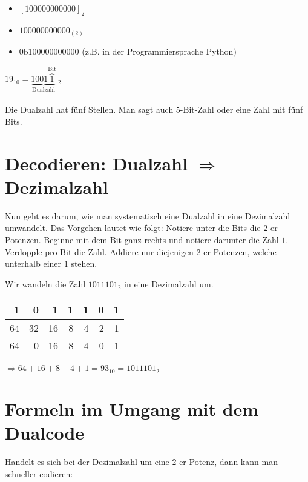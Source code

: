 \begin{itemize}
	\item $[100000000000]_2$
	\item $100000000000_{(2)}$
	\item $0\text{b}100000000000$ (z.B. in der Programmiersprache Python)
\end{itemize}

\begin{example}
$19_{10} = \underbrace{1001\overbrace{1}^{\textrm{Bit}}}_{\textrm{Dualzahl}}$$~_2$ \\ \\ Die Dualzahl hat fünf Stellen. Man sagt auch $5$-Bit-Zahl oder eine Zahl mit fünf Bits.
\end{example}

\section{Decodieren: Dualzahl $\Rightarrow$ Dezimalzahl}

Nun geht es darum, wie man systematisch eine Dualzahl in eine Dezimalzahl umwandelt. Das Vorgehen lautet wie folgt: Notiere unter die Bits die $2$-er Potenzen. Beginne mit dem Bit ganz rechts und notiere darunter die Zahl $1$. Verdopple pro Bit die Zahl. Addiere nur diejenigen $2$-er Potenzen, welche unterhalb einer $1$ stehen.

\begin{example}
Wir wandeln die Zahl $1011101_{2}$ in eine Dezimalzahl um.

\begin{table}[htb]
\centering
\begin{tabular}{|r|r|r|r|r|r|r|}
\hline
1  & 0  & 1  & 1 & 1 & 0 & 1 \\ \hline
64 & 32 & 16 & 8 & 4 & 2 & 1 \\ \hline\hline
64 & 0  & 16 & 8 & 4 & 0 & 1 \\ \hline
\end{tabular}
\end{table}

$\Rightarrow 64 + 16 + 8 + 4 + 1 = 93_{10} = 1011101_{2}$

\end{example}

\section{Formeln im Umgang mit dem Dualcode}

Handelt es sich bei der Dezimalzahl um eine $2$-er Potenz, dann kann man schneller codieren:

